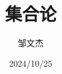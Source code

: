 \documentclass[lang=cn,newtx,10pt,sCheme=Chinese]{../../Template/elegantbook}
\title{集合论}
\author{邹文杰}
\institute{无}
\date{2024/10/25}
\begin{document}

\maketitle
\frontmatter

\tableofcontents%

\mainmatter
\everymath{\displaystyle} %






% 

% 

% 

% 

% 

% 

% 

% 

% 

% 

% 



\end{document}
